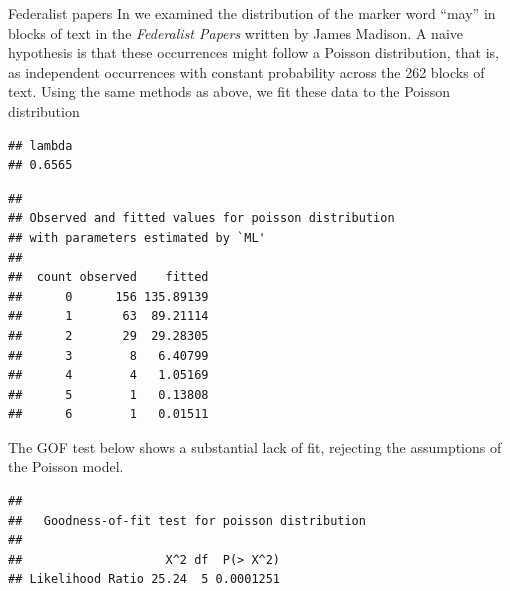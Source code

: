 \documentclass[11pt]{book}
\renewenvironment{knitrout}{\small\renewcommand{\baselinestretch}{.85}}{} %
\begin{document}
\begin{Example}[Fedfit]{Federalist papers}
In  we examined the distribution of the marker word
``may'' in blocks of text in the \emph{Federalist Papers} written by
James Madison.  A naive hypothesis is that these occurrences might
follow a Poisson distribution, that is, as independent occurrences
with constant probability across the 262 blocks of text.
Using the same methods as above, we fit these data to the
Poisson distribution
\begin{knitrout}
\color{fgcolor}\begin{kframe}
\begin{alltt}
\hlstd{(}\hlstd{,} \hlstd{=}\hlstd{)}
 \hlkwb{<-}  \hlstd{=}\hlstd{)}
\hlopt{$}
\end{alltt}
\begin{verbatim}
## lambda 
## 0.6565
\end{verbatim}
\begin{alltt}
\end{alltt}
\begin{verbatim}
## 
## Observed and fitted values for poisson distribution
## with parameters estimated by `ML' 
## 
##  count observed    fitted
##      0      156 135.89139
##      1       63  89.21114
##      2       29  29.28305
##      3        8   6.40799
##      4        4   1.05169
##      5        1   0.13808
##      6        1   0.01511
\end{verbatim}
\end{kframe}
\end{knitrout}
The GOF test below shows a substantial lack of fit, rejecting the
assumptions of the Poisson model. 
\begin{knitrout}
\color{fgcolor}\begin{kframe}
\begin{alltt}
\end{alltt}
\begin{verbatim}
## 
## 	 Goodness-of-fit test for poisson distribution
## 
##                    X^2 df  P(> X^2)
## Likelihood Ratio 25.24  5 0.0001251
\end{verbatim}
\end{kframe}
\end{knitrout}

\end{Example}
\end{document}
